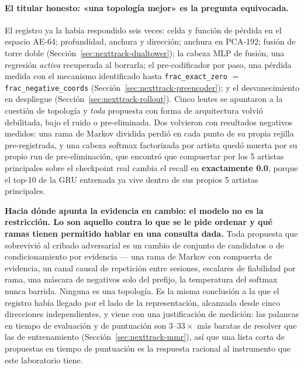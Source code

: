 \documentclass[11pt]{article}
\begin{document}
\paragraph{El titular honesto: «una topología mejor» es la pregunta equivocada.} El
registro ya la había respondido seis veces: celda y función de pérdida en el
espacio AE-64; profundidad, anchura y dirección; anchura en PCA-192; fusión de
torre doble (Sección~\ref{sec:nexttrack-dualtower}); la cabeza MLP de fusión, una regresión
\emph{activa} recuperada al borrarla; el pre-codificador por paso, una pérdida
medida con el mecanismo identificado hasta \texttt{frac\_exact\_zero} $=$
\texttt{frac\_negative\_coords} (Sección~\ref{sec:nexttrack-preencoder}); y el
desvanecimiento en despliegue (Sección~\ref{sec:nexttrack-rollout}). Cinco lentes se
apuntaron a la cuestión de topología y \emph{toda} propuesta con forma de
arquitectura volvió debilitada, bajo el ruido o pre-eliminada. Dos volvieron con
resultados negativos medidos: una rama de Markov dividida perdió en cada punto de
su propia rejilla pre-registrada, y una cabeza softmax factorizada por artista
quedó muerta por su propio run de pre-eliminación, que encontró que compuertar por
los 5 artistas principales sobre el checkpoint real cambia el recall en
\textbf{exactamente \num{0.0}}, porque el top-10 de la GRU entrenada ya vive dentro
de sus propios 5 artistas principales.

\textbf{Hacia dónde apunta la evidencia en cambio: el modelo no es la restricción.
Lo son aquello contra lo que se le pide ordenar y qué ramas tienen permitido hablar
en una consulta dada.} Toda propuesta que sobrevivió al cribado adversarial es un
cambio de conjunto de candidatos o de condicionamiento por evidencia --- una rama de
Markov con compuerta de evidencia, un canal causal de repetición entre sesiones,
escalares de fiabilidad por rama, una máscara de negativos solo del prefijo, la
temperatura del softmax nunca barrida. Ninguna es una topología. Es la misma
conclusión a la que el registro había llegado por el lado de la representación,
alcanzada desde cinco direcciones independientes, y viene con una justificación de
medición: las palancas en tiempo de evaluación y de puntuación son
$\numrange{3}{33}\times$ más baratas de resolver que las de entrenamiento
(Sección~\ref{sec:nexttrack-mmr}), así que una lista corta de propuestas en tiempo de
puntuación es la respuesta racional al instrumento que este laboratorio tiene.
\end{document}
